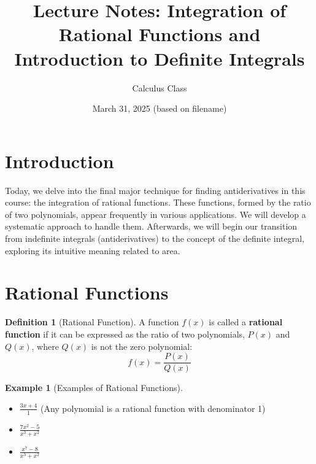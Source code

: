 \documentclass[11pt]{article}
\title{Lecture Notes: Integration of Rational Functions and Introduction to Definite Integrals}
\author{Calculus Class}
\date{March 31, 2025 (based on filename)}
\theoremstyle{plain}
\theoremstyle{definition}
\newtheorem{definition}[theorem]{Definition}
\newtheorem{example}[theorem]{Example}
\theoremstyle{remark}
\begin{document}
\maketitle


\section{Introduction}

Today, we delve into the final major technique for finding antiderivatives in this course: the integration of rational functions. These functions, formed by the ratio of two polynomials, appear frequently in various applications. We will develop a systematic approach to handle them. Afterwards, we will begin our transition from indefinite integrals (antiderivatives) to the concept of the definite integral, exploring its intuitive meaning related to area.

\section{Rational Functions}

\begin{definition}[Rational Function]
A function $f(x)$ is called a \textbf{rational function} if it can be expressed as the ratio of two polynomials, $P(x)$ and $Q(x)$, where $Q(x)$ is not the zero polynomial:
\[ f(x) = \frac{P(x)}{Q(x)} \]
\end{definition}

\begin{example}[Examples of Rational Functions]
\begin{itemize}
    \item $\frac{3x + 4}{1}$ (Any polynomial is a rational function with denominator 1)
    \item $\frac{7x^2 - 5}{x^3 + x^2}$
    \item $\frac{x^7 - 8}{x^3 + x^2}$
\end{itemize}
\end{example}
\end{document}
